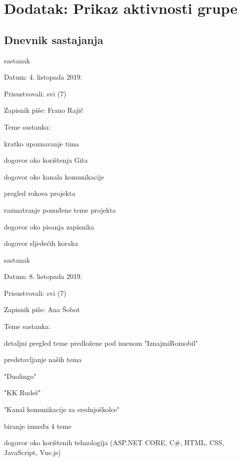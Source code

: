 \chapter*{Dodatak: Prikaz aktivnosti grupe}
		
		\section*{Dnevnik sastajanja}
		
		\begin{packed_enum}
			\item  sastanak
			
			\item[] \begin{packed_item}
				\item Datum: 4. listopada 2019.
				\item Prisustvovali: svi (7)
				\item Zapisnik piše: Frano Rajič
				\item Teme sastanka:
				\begin{packed_item}
					\item kratko upoznavanje tima
					\item dogovor oko korištenja Gita
					\item dogovor oko kanala komunikacije
					\item pregled rokova projekta
					\item razmatranje ponuđene teme projekta
					\item dogovor oko pisanja zapisnika
					\item dogovor sljedećih koraka
				\end{packed_item}
			\end{packed_item}
						
			\item  sastanak
			\item[] \begin{packed_item}
				\item Datum: 8. listopada 2019.
				\item Prisustvovali: svi (7)
				\item Zapisnik piše: Ana Šobot
				\item Teme sastanka:
				\begin{packed_item}
					\item detaljni pregled teme predložene pod imenom "IznajmiRomobil" 
					\item predstavljanje naših tema
					\begin{packed_item}
						\item "Duolingo"
						\item "KK Rudeš"
						\item "Kanal komunikacije za srednjoškolce"
					\end{packed_item}
					\item biranje između 4 teme
					\item dogovor oko korištenih tehnologija (ASP.NET CORE, C\#, HTML, CSS, JavaScript, Vue.js)
				\end{packed_item}
			\end{packed_item}


\end{packed_enum}

